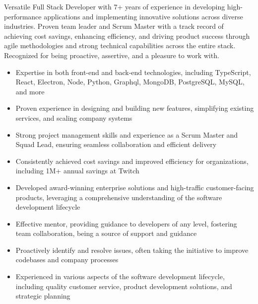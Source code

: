 \par
Versatile Full Stack Developer with 7+ years of experience in developing high-performance applications and implementing innovative solutions across diverse industries.
Proven team leader and Scrum Master with a track record of achieving cost savings, enhancing efficiency, and driving product success through agile methodologies and strong technical capabilities across the entire stack. Recognized for being proactive, assertive, and a pleasure to work with.

\begin{itemize}[itemsep=-5pt]
    \item Expertise in both front-end and back-end technologies, including TypeScript, React, Electron, Node, Python, Graphql, MongoDB, PostgreSQL, MySQL, and more
    \item Proven experience in designing and building new features, simplifying existing services, and scaling company systems
    \item Strong project management skills and experience as a Scrum Master and Squad Lead, ensuring seamless collaboration and efficient delivery
    \item Consistently achieved cost savings and improved efficiency for organizations, including \textdollar 1M+ annual savings at Twitch
    \item Developed award-winning enterprise solutions and high-traffic customer-facing products, leveraging a comprehensive understanding of the software development lifecycle
    \item Effective mentor, providing guidance to developers of any level, fostering team collaboration, being a source of support and guidance
    \item Proactively identify and resolve issues, often taking the initiative to improve codebases and company processes
    \item Experienced in various aspects of the software development lifecycle, including quality customer service, product development solutions, and strategic planning
\end{itemize}